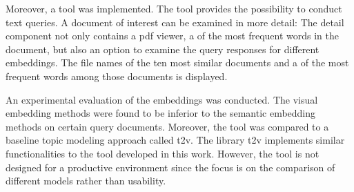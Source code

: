 Moreover, a tool was implemented.
The tool provides the possibility to conduct text queries.
A document of interest can be examined in more detail:
The detail component not only contains a \ac{pdf} viewer, 
a \wordcloud{} of the most frequent words in the document, but also an option to examine the query responses for different embeddings.
The file names of the ten most similar documents and a \wordcloud{} of the most frequent words among those documents is displayed.

An experimental evaluation of the embeddings was conducted.
The visual embedding methods were found to be inferior to the semantic embedding methods on certain query documents.
Moreover, the tool was compared to a baseline topic modeling approach called \ac{t2v}.
The library \ac{t2v} implements similar functionalities to the tool developed in this work.
However, the tool is not designed for a productive environment since the focus is on the comparison of different models rather than usability.